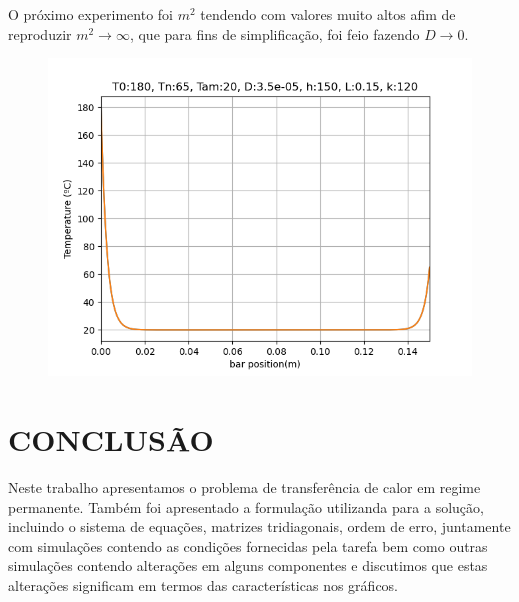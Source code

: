 \documentclass[a4paper, 12pt]{article}
\begin{document}
O próximo experimento foi $m^2$ tendendo com valores muito altos afim de reproduzir $m^2 \to \infty$, que para fins de simplificação, foi feio fazendo $D \to 0$. 
\begin{figure}[ht!]
\centering
\includegraphics[scale=0.8]{figs/trd.png}
\end{figure}

\section{CONCLUSÃO}

Neste trabalho apresentamos o problema de transferência de calor em regime 
permanente. Também foi apresentado a formulação utilizanda para a solução, incluindo o sistema de equações, matrizes tridiagonais, ordem de erro, juntamente com simulações contendo as condições fornecidas pela tarefa bem como outras simulações contendo alterações em alguns componentes e discutimos que estas alterações significam em termos das características nos gráficos. 
\end{document}
